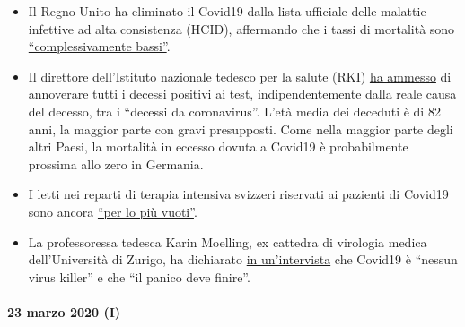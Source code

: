 \begin{itemize}
\tightlist
\item
  Il Regno Unito ha eliminato il Covid19 dalla lista ufficiale delle
  malattie infettive ad alta consistenza (HCID), affermando che i tassi
  di mortalità sono
  \href{https://www.gov.uk/guidance/high-consequence-infectious-diseases-hcid\#status-of-covid-19}{``complessivamente
  bassi''}.
\item
  Il direttore dell'Istituto nazionale tedesco per la salute (RKI)
  \href{https://swprs.org/rki-relativiert-corona-todesfaelle/}{ha
  ammesso} di annoverare tutti i decessi positivi ai test,
  indipendentemente dalla reale causa del decesso, tra i ``decessi da
  coronavirus''. L'età media dei deceduti è di 82 anni, la maggior parte
  con gravi presupposti. Come nella maggior parte degli altri Paesi, la
  mortalità in eccesso dovuta a Covid19 è probabilmente prossima allo
  zero in Germania.
\item
  I letti nei reparti di terapia intensiva svizzeri riservati ai
  pazienti di Covid19 sono ancora
  \href{https://www.aargauerzeitung.ch/aargau/kanton-aargau/erst-3-von-100-aargauer-betten-der-intensivstationen-sind-belegt-so-ruesten-sich-die-spitaeler-auf-die-epidemie-137332716}{``per
  lo più vuoti''}.
\item
  La professoressa tedesca Karin Moelling, ex cattedra di virologia
  medica dell'Università di Zurigo, ha dichiarato
  \href{https://www.radioeins.de/programm/sendungen/die_profis/archivierte_sendungen/beitraege/corona-virus-kein-killervirus.html}{in
  un'intervista} che Covid19 è ``nessun virus killer'' e che ``il panico
  deve finire''.
\end{itemize}

\hypertarget{23-marzo-2020-i}{%
\paragraph{23 marzo 2020 (I)}\label{23-marzo-2020-i}}

